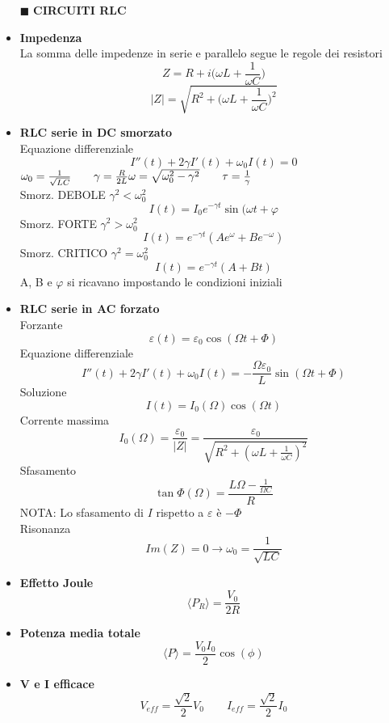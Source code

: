 \documentclass{book}
\newcommand{\g}{\textbf}
\newcommand{\e}{\begin{equation}}
\newcommand{\ex}{\end{equation} }
\renewcommand{\it}{\item[$\cdot$]}
\begin{document}
\begin{multicols}{4}
\begin{itemize}
\item [$\blacksquare$] \g{CIRCUITI RLC}
    \it \g{Impedenza} \\
        La somma delle impedenze in serie e parallelo segue le regole dei resistori
        \e{Z=R+i\biggl(\omega L+\frac{1}{\omega C}\biggr)} \ex
        \e{|Z|=\sqrt{R^2+\biggl(\omega L+\frac{1}{\omega C}\biggr)^2}} \ex
    \it \g{RLC serie in DC smorzato} \\
    Equazione differenziale
    \e{I''(t)+2\gamma I'(t)+\omega_0 I(t)=0} \ex
        $\omega_0=\frac{1}{\sqrt{LC}} \qquad \gamma=\frac{R}{2L} \\
        \omega=\sqrt{\omega_0^2-\gamma^2} \qquad \tau=\frac{1}{\gamma}$ \\
        Smorz. DEBOLE $\gamma^2<\omega_0^2$
        \e{I(t)=I_0 e^{-\gamma t} \sin(\omega t+\varphi} \ex
        Smorz. FORTE $\gamma^2>\omega_0^2$
        \e{I(t)=e^{-\gamma t}(Ae^\omega+Be^{-\omega})} \ex
        Smorz. CRITICO $\gamma^2=\omega_0^2$
        \e{I(t)=e^{-\gamma t}(A+Bt)} \ex
        A, B e $\varphi$ si ricavano impostando le condizioni iniziali
    \it \g{RLC serie in AC forzato} \\
        Forzante
        \e{\varepsilon(t)=\varepsilon_0\cos(\Omega t + \Phi)} \ex
        Equazione differenziale
        \e{I''(t)+2\gamma I'(t)+\omega_0 I(t)=-\frac{\Omega\varepsilon_0}{L}\sin(\Omega t + \Phi)} \ex
        Soluzione
        \e{I(t)=I_0(\Omega)\cos(\Omega t )} \ex
        Corrente massima
        \e{I_0(\Omega)=\frac{\varepsilon_0}{|Z|}=\frac{\varepsilon_0}{\sqrt{R^2+(\omega L+\frac{1}{\omega C})^2}}} \ex
        Sfasamento
        \e{\tan\Phi(\Omega)=\frac{L\Omega-\frac{1}{\Omega C}}{R}} \ex
        NOTA: Lo sfasamento di $I$ rispetto a $\varepsilon$ è $-\Phi$ \\
        Risonanza
        \e{Im(Z)=0 \rightarrow \omega_0=\frac{1}{\sqrt{LC}}} \ex
    \it \g{Effetto Joule}
        \e{\langle P_R\rangle=\frac{V_0}{2R}} \ex
    \it \g{Potenza media totale}
        \e{\langle P\rangle=\frac{V_0I_0}{2}\cos(\phi)} \ex
    \it \g{V e I efficace}
        \e{V_{eff}=\frac{\sqrt{2}}{2}V_0 \qquad I_{eff}=\frac{\sqrt{2}}{2}I_0} \ex


\end{itemize}
\end{multicols}
\end{document}
